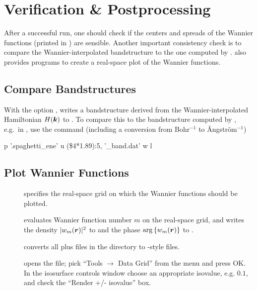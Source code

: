 \section{Verification \& Postprocessing}
\label{sec:quickstart_post}

After a successful \wannier run, one should check if the centers and
spreads of the Wannier functions (printed in ) are
sensible.  Another important consistency check is to compare the
Wannier-interpolated bandstructure to the one computed by \wien.
\Wtow also provides programs to create a real-space plot of the
Wannier functions.

\subsection{Compare Bandstructures}
With the option , \wannier writes a bandstructure
derived from the Wannier-inter\-po\-la\-ted Hamiltonian $H(\boldsymbol k)$ to
.  To compare this to the bandstructure
computed by , e.g.\ in , use the command
(including a conversion from Bohr$^{-1}$ to \AA{}ng\-str\"om$^{-1}$)
\begin{usage}
  p '\case.spaghetti\_ene' u (\$4*1.89):5, '\case{}\_band.dat' w l
\end{usage}

\subsection{Plot Wannier Functions}
\begin{description}
\item[] specifies the real-space grid on which the
  Wannier functions should be plotted.
\item[] evaluates Wannier function number
  $m$ on the real-space grid, and writes the density $|w_m(\boldsymbol r)|^2$
  to  and the phase $\arg\left\{w_m(\boldsymbol
  r)\right\}$ to .
\item [\wplottoxsf] converts all  plus
   files in the directory to \xcrys-style
   files.
\item [] opens the
   file; pick ``Tools $\rightarrow$ Data Grid'' from the
  menu and press OK. In the isosurface controls window choose an
  appropriate isovalue, e.g. $0.1$, and check the ``Render +/-
  isovalue'' box.
\end{description}


